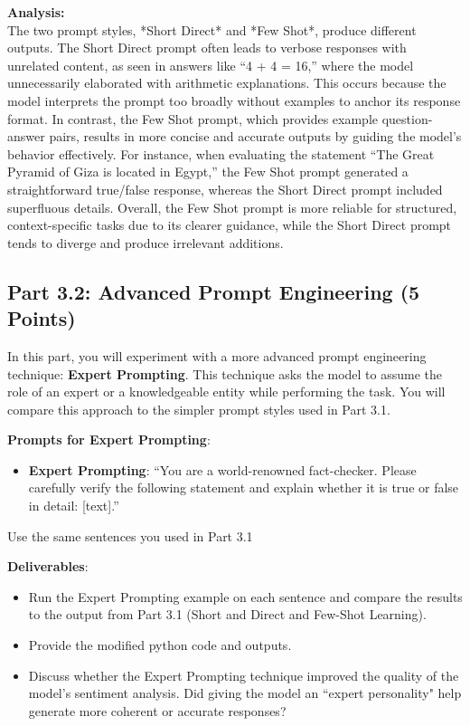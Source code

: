 \documentclass[11pt, oneside]{article}   	%
\begin{document}
\textbf{Analysis: } \\
The two prompt styles, *Short Direct* and *Few Shot*, produce different outputs. 
The Short Direct prompt often leads to verbose responses with unrelated content, as seen in answers like “4 + 4 = 16,” where the model unnecessarily elaborated with arithmetic explanations. 
This occurs because the model interprets the prompt too broadly without examples to anchor its response format. 
In contrast, the Few Shot prompt, which provides example question-answer pairs, results in more concise and accurate outputs by guiding the model's behavior effectively.
For instance, when evaluating the statement “The Great Pyramid of Giza is located in Egypt,” the Few Shot prompt generated a straightforward true/false response, whereas the Short Direct prompt included superfluous details. 
Overall, the Few Shot prompt is more reliable for structured, context-specific tasks due to its clearer guidance, while the Short Direct prompt tends to diverge and produce irrelevant additions.

\subsection*{Part 3.2: Advanced Prompt Engineering (5 Points)}

In this part, you will experiment with a more advanced prompt engineering technique: \textbf{Expert Prompting}. This technique asks the model to assume the role of an expert or a knowledgeable entity while performing the task. You will compare this approach to the simpler prompt styles used in Part 3.1.

\textbf{Prompts for Expert Prompting}:
\begin{itemize}
    \item \textbf{Expert Prompting}: “You are a world-renowned fact-checker. Please carefully verify the following statement and explain whether it is true or false in detail: [text].”
\end{itemize}

Use the same sentences you used in Part 3.1

\textbf{Deliverables}:
\begin{itemize}
    \item Run the Expert Prompting example on each sentence and compare the results to the output from Part 3.1 (Short and Direct and Few-Shot Learning).
    \item Provide the modified python code and outputs.
    \item Discuss whether the Expert Prompting technique improved the quality of the model’s sentiment analysis. Did giving the model an ``expert personality" help generate more coherent or accurate responses?
\end{itemize}
\end{document}
